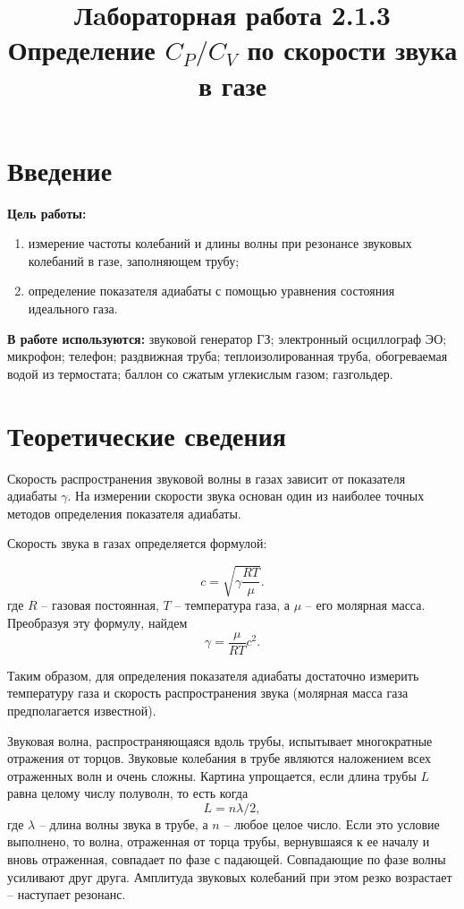 \documentclass{article}
\date{}
\author{}
\title{Лaбораторная работа 2.1.3 \\ Определение $C_P/C_V$ по скорости звука в газе}
\begin{document}
\maketitle

\section*{Введение}
\textbf{Цель работы:}  \begin{enumerate}
\item измерение частоты колебаний и длины волны при резонансе звуковых колебаний в газе, заполняющем трубу;
\item определение показателя адиабаты с помощью уравнения состояния идеального газа.
\end{enumerate}

\textbf{В работе используются:} звуковой генератор ГЗ; электронный осциллограф ЭО; микрофон; телефон; раздвижная труба; теплоизолированная труба, обогреваемая водой из термостата; баллон со сжатым углекислым газом; газгольдер.

\section*{Теоретические сведения}

Скорость распространения звуковой волны в газах зависит от показателя адиабаты $ \gamma $. На измерении скорости звука основан один из наиболее точных методов определения показателя адиабаты.

Скорость звука в газах определяется формулой:

\begin{equation}\label{velocity}
c=\sqrt{\gamma\frac{RT}{\mu}}.
\end{equation}
где $ R $ -- газовая постоянная, $ T $ -- температура газа, а $ \mu $ -- его молярная масса. Преобразуя эту формулу, найдем
\begin{equation}\label{gamma}
\boxed{\gamma = \frac{\mu}{RT}c^2}.
\end{equation}

Таким образом, для определения показателя адиабаты достаточно измерить температуру газа и скорость распространения звука (молярная масса газа предполагается известной).

Звуковая волна, распространяющаяся вдоль трубы, испытывает многократные отражения от торцов. Звуковые колебания в трубе являются наложением всех отраженных волн и очень сложны. Картина упрощается, если длина трубы $ L $ равна целому числу полуволн, то есть когда \[ L=n\lambda/2, \] где $ \lambda $ -- длина волны звука в трубе, а $ n $ -- любое целое число. Если это условие выполнено, то волна, отраженная от торца трубы, вернувшаяся к ее началу и вновь отраженная, совпадает по фазе с падающей. Совпадающие по фазе волны усиливают друг друга. Амплитуда звуковых колебаний при этом резко возрастает -- наступает резонанс.
\end{document}
